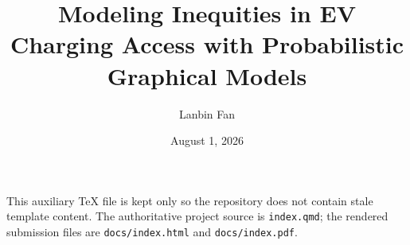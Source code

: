 \documentclass{article}
\title{Modeling Inequities in EV Charging Access with Probabilistic Graphical Models}
\author{Lanbin Fan}
\date{August 1, 2026}
\begin{document}
\maketitle

This auxiliary TeX file is kept only so the repository does not contain
stale template content. The authoritative project source is
\texttt{index.qmd}; the rendered submission files are
\texttt{docs/index.html} and \texttt{docs/index.pdf}.
\end{document}
